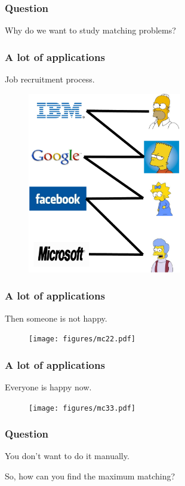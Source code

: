 \documentclass[hyperref={pdfpagelabels=false}]{beamer}
\begin{document}
\frame
{
	\frametitle{Question}
	
	\huge{Why do we want to study matching problems?}
	
}

\frame
{
	\frametitle{A lot of applications}
	Job recruitment process.
	
	\begin{figure}[htb]
	\centering
	\includegraphics[width=0.6\textwidth]{figures/mc.pdf}
	\end{figure}
}

\frame
{
	\frametitle{A lot of applications}
	Then someone is not happy.
	
	\begin{figure}[htb]
	\centering
	\texttt{[image: figures/mc22.pdf]}
	\end{figure}
}

\frame
{
	\frametitle{A lot of applications}
	Everyone is happy now.
	
	\begin{figure}[htb]
	\centering
	\texttt{[image: figures/mc33.pdf]}
	\end{figure}
}

\frame
{
	\frametitle{Question}
	
	\huge{You don't want to do it manually.}
	
	\bigskip
	
	\huge{So, how can you find the maximum matching?}
	
}
\end{document}
